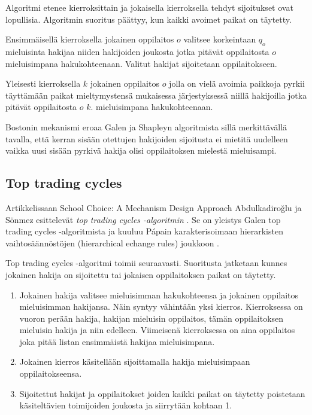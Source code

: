 \documentclass[gradu, twoside]{tktltiki}
\begin{document}
Algoritmi etenee kierroksittain ja jokaisella kierroksella tehdyt
sijoitukset ovat lopullisia. Algoritmin suoritus päättyy, kun kaikki
avoimet paikat on täytetty.

\begin{itemize*}
\item Ensimmäisellä kierroksella jokainen oppilaitos $o$ valitsee
  korkeintaan $q_o$ mieluisinta hakijaa niiden hakijoiden joukosta
  jotka pitävät oppilaitosta $o$ mieluisimpana hakukohteenaan. Valitut
  hakijat sijoitetaan oppilaitokseen.

\item Yleisesti kierroksella $k$ jokainen oppilaitos $o$ jolla on
  vielä avoimia paikkoja pyrkii täyttämään paikat mieltymystensä
  mukaisessa järjestyksessä niillä hakijoilla jotka pitävät
  oppilaitosta $o$ $k.$ mieluisimpana hakukohteenaan.
\end{itemize*}

Bostonin mekanismi eroaa Galen ja Shapleyn algoritmista sillä
merkittävällä tavalla, että kerran sisään otettujen hakijoiden
sijoitusta ei mietitä uudelleen vaikka uusi sisään pyrkivä hakija
olisi oppilaitoksen mielestä mieluisampi.

\subsection{Top trading cycles}
\label{top_trading_cycles}

Artikkelissaan School Choice: A Mechanism Design Approach
Abdulkadiroğlu ja Sönmez esittelevät \emph{top trading cycles
  -algoritmin} \cite{abdusön03}. Se on yleistys Galen top trading
cycles -algoritmista \cite{shapley74} ja kuuluu Pápain
karakterisoimaan hierarkisten vaihtosäännöstöjen (hierarchical echange
rules) joukkoon \cite{papai00}.
\newpage

Top trading cycles -algoritmi toimii seuraavasti. Suoritusta jatketaan
kunnes jokainen hakija on sijoitettu tai jokaisen oppilaitoksen paikat
on täytetty.
\begin{enumerate}

\item Jokainen hakija valitsee mieluisimman hakukohteensa ja jokainen
  oppilaitos mieluisimman hakijansa. Näin syntyy vähintään yksi
  kierros. Kierroksessa on vuoron perään hakija, hakijan mieluisin
  oppilaitos, tämän oppilaitoksen mieluisin hakija ja niin edelleen.
  Viimeisenä kierroksessa on aina oppilaitos joka pitää listan
  ensimmäistä hakijaa mieluisimpana.

\item Jokainen kierros käsitellään sijoittamalla hakija mieluisimpaan
  oppilaitokseensa.

\item Sijoitettut hakijat ja oppilaitokset joiden kaikki paikat on
  täytetty poistetaan käsiteltävien toimijoiden joukosta ja siirrytään
  kohtaan 1.
\end{enumerate}
\end{document}
